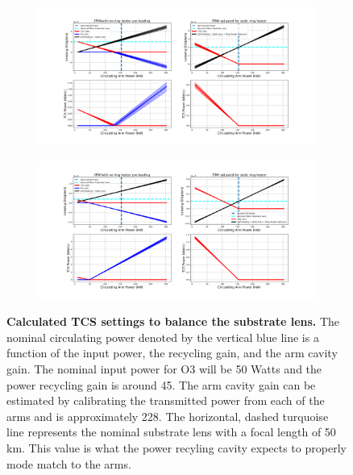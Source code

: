 \begin{figure}[ht]
	\centering
	\begin{subfigure}[b]{1.0\textwidth}
		\centering
		\includegraphics[width=\textwidth]{../Figures/ITMX_TCS_Settings.png}
		\label{fig:TCS_ITMX}
	\end{subfigure}
	\hfill
	\begin{subfigure}[b]{1.0\textwidth}
		\centering
		\includegraphics[width=\textwidth]{../Figures/ITMY_TCS_Settings.png}
		\label{fig:TCS_ITMY}
	\end{subfigure}
	\caption[Calculated TCS settings to balance the substrate lens.]{
		\textbf{Calculated TCS settings to balance the substrate lens.}  The nominal circulating power denoted by the vertical blue line is a function of the input power, the recycling gain, and the arm cavity gain.  The nominal input power for O3 will be 50 Watts and the power recycling gain is around 45.  The arm cavity gain can be estimated by calibrating the transmitted power from each of the arms and is approximately 228.  The horizontal, dashed turquoise line represents the nominal substrate lens with a focal length of 50 km.  This value is what the power recyling cavity expects to properly mode match to the arms. }
	\label{fig:TCS_ITMs}
\end{figure}

